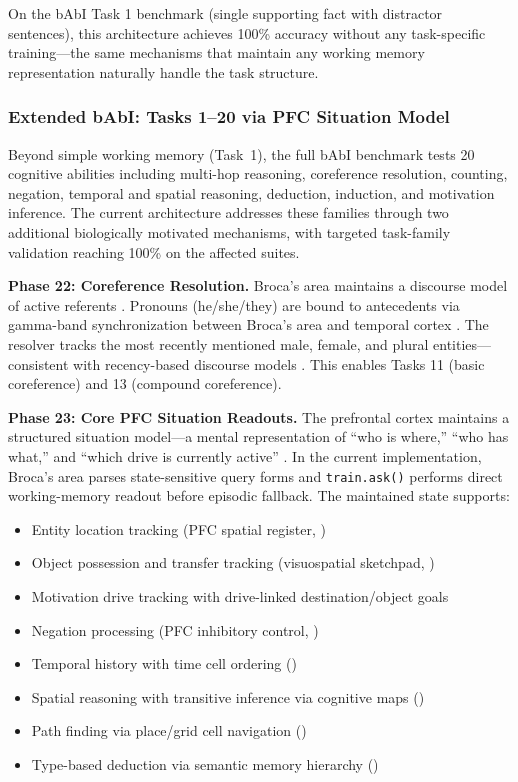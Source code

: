 \documentclass[11pt]{article}
\begin{document}
On the bAbI Task 1 benchmark (single supporting fact with distractor sentences), this architecture achieves 100\% accuracy without any task-specific training---the same mechanisms that maintain any working memory representation naturally handle the task structure.

\subsubsection{Extended bAbI: Tasks 1--20 via PFC Situation Model}

Beyond simple working memory (Task~1), the full bAbI benchmark \citep{weston2015towards} tests 20 cognitive abilities including multi-hop reasoning, coreference resolution, counting, negation, temporal and spatial reasoning, deduction, induction, and motivation inference. The current architecture addresses these families through two additional biologically motivated mechanisms, with targeted task-family validation reaching 100\% on the affected suites.

\textbf{Phase 22: Coreference Resolution.} Broca's area maintains a discourse model of active referents \citep{hagoort2005broca}. Pronouns (he/she/they) are bound to antecedents via gamma-band synchronization between Broca's area and temporal cortex \citep{fries2005mechanism}. The resolver tracks the most recently mentioned male, female, and plural entities---consistent with recency-based discourse models \citep{howard2002distributed}. This enables Tasks 11 (basic coreference) and 13 (compound coreference).

\textbf{Phase 23: Core PFC Situation Readouts.} The prefrontal cortex maintains a structured situation model---a mental representation of ``who is where,'' ``who has what,'' and ``which drive is currently active'' \citep{baddeley2000episodic, goldman1995cellular}. In the current implementation, Broca's area parses state-sensitive query forms and \texttt{train.ask()} performs direct working-memory readout before episodic fallback. The maintained state supports:
\begin{itemize}
  \item Entity location tracking (PFC spatial register, \citealt{goldman1995cellular})
  \item Object possession and transfer tracking (visuospatial sketchpad, \citealt{baddeley2000episodic})
  \item Motivation drive tracking with drive-linked destination/object goals
  \item Negation processing (PFC inhibitory control, \citealt{miller2001integrative})
  \item Temporal history with time cell ordering (\citealt{eichenbaum2014time})
  \item Spatial reasoning with transitive inference via cognitive maps (\citealt{okeefe1978hippocampus})
  \item Path finding via place/grid cell navigation (\citealt{moser2008place})
  \item Type-based deduction via semantic memory hierarchy (\citealt{collins1969retrieval})
\end{itemize}
\end{document}
